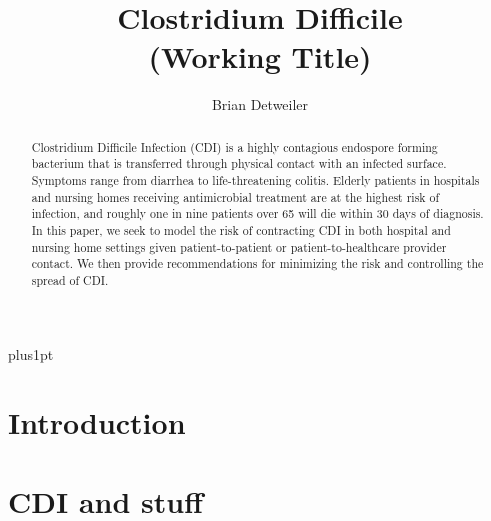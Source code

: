 \documentclass[12pt]{ociamthesis}\usepackage[]{graphicx}\usepackage[]{color}
\title{Clostridium Difficile\\[1ex]     %
       (Working Title)}   %
\author{Brian Detweiler}
\begin{document}
\baselineskip=18pt plus1pt

\setcounter{secnumdepth}{3}
\setcounter{tocdepth}{3}


\maketitle                  %

 


\begin{abstract}
Clostridium Difficile Infection (CDI) is a highly contagious endospore forming bacterium that is transferred
through physical contact with an infected surface. Symptoms range from diarrhea to
life-threatening colitis. Elderly patients in hospitals and nursing homes receiving antimicrobial
treatment are at the highest risk of infection, and roughly one in nine patients over 65 will
die within 30 days of diagnosis. In this paper, we seek to model the risk of contracting CDI in both
hospital and nursing home settings given patient-to-patient or patient-to-healthcare provider 
contact. We then provide recommendations for minimizing the risk and controlling the spread of CDI.
\end{abstract}

\begin{romanpages}          %
\tableofcontents            %
\listoffigures              %
\end{romanpages}            %


\chapter{Introduction}

\lipsum


\chapter{CDI and stuff}
\end{document}
